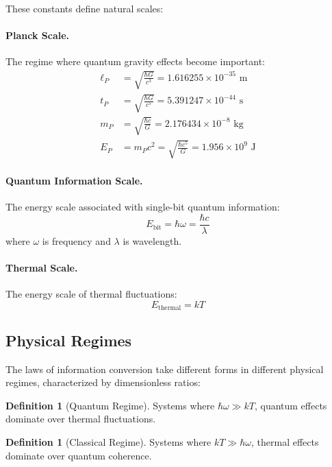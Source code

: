 \documentclass[11pt,a4paper]{article}
\theoremstyle{plain}
\theoremstyle{definition}
\newtheorem{definition}[theorem]{Definition}
\theoremstyle{remark}
\begin{document}
These constants define natural scales:

\paragraph{Planck Scale.} The regime where quantum gravity effects become important:
\begin{align}
\ell_P &= \sqrt{\frac{\hbar G}{c^3}} = 1.616255\times 10^{-35}\text{ m} \\
t_P &= \sqrt{\frac{\hbar G}{c^5}} = 5.391247\times 10^{-44}\text{ s} \\
m_P &= \sqrt{\frac{\hbar c}{G}} = 2.176434\times 10^{-8}\text{ kg} \\
E_P &= m_P c^2 = \sqrt{\frac{\hbar c^5}{G}} = 1.956\times 10^9\text{ J}
\end{align}

\paragraph{Quantum Information Scale.} The energy scale associated with single-bit quantum information:
\begin{equation}
E_{\text{bit}} = \hbar\omega = \frac{\hbar c}{\lambda}
\end{equation}
where $\omega$ is frequency and $\lambda$ is wavelength.

\paragraph{Thermal Scale.} The energy scale of thermal fluctuations:
\begin{equation}
E_{\text{thermal}} = kT
\end{equation}

\subsection{Physical Regimes}

The laws of information conversion take different forms in different physical regimes, characterized by dimensionless ratios:

\begin{definition}[Quantum Regime]
Systems where $\hbar\omega \gg kT$, quantum effects dominate over thermal fluctuations.
\end{definition}

\begin{definition}[Classical Regime]
Systems where $kT \gg \hbar\omega$, thermal effects dominate over quantum coherence.
\end{definition}
\end{document}
